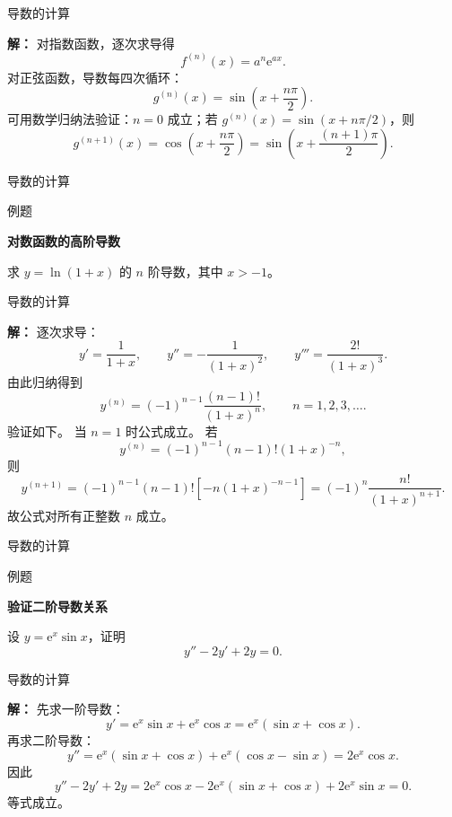 \documentclass[aspectratio=169,10pt,fontset=fandol]{ctexbeamer}
\newcommand{\ee}{\mathrm{e}}
\begin{document}
\begin{frame}[t,fragile]{导数的计算}
\footnotesize
{\footnotesize
\textbf{解：}
对指数函数，逐次求导得
\[
f^{(n)}(x)=a^n\ee^{ax}.
\]
对正弦函数，导数每四次循环：
\[
g^{(n)}(x)=\sin\left(x+\frac{n\pi}{2}\right).
\]
可用数学归纳法验证：$n=0$ 成立；若 $g^{(n)}(x)=\sin(x+n\pi/2)$，则
\[
g^{(n+1)}(x)=\cos\left(x+\frac{n\pi}{2}\right)=\sin\left(x+\frac{(n+1)\pi}{2}\right).
\]

}
\end{frame}
\begin{frame}[t,fragile]{导数的计算}
\footnotesize
\begin{block}{例题}
{\footnotesize
\textbf{对数函数的高阶导数}\par

求 $y=\ln(1+x)$ 的 $n$ 阶导数，其中 $x>-1$。

}
\end{block}
\end{frame}
\begin{frame}[t,fragile]{导数的计算}
\footnotesize
{\footnotesize
\textbf{解：}
逐次求导：
\[
y'=\frac1{1+x},\qquad
y''=-\frac1{(1+x)^2},\qquad
y'''=\frac{2!}{(1+x)^3}.
\]
由此归纳得到
\[
y^{(n)}=(-1)^{n-1}\frac{(n-1)!}{(1+x)^n},\qquad n=1,2,3,\ldots.
\]
验证如下。 当 $n=1$ 时公式成立。 若
\[
y^{(n)}=(-1)^{n-1}(n-1)!(1+x)^{-n},
\]
则
\[
y^{(n+1)}
=(-1)^{n-1}(n-1)![-n(1+x)^{-n-1}]
=(-1)^n\frac{n!}{(1+x)^{n+1}}.
\]
故公式对所有正整数 $n$ 成立。

}
\end{frame}
\begin{frame}[t,fragile]{导数的计算}
\footnotesize
\begin{block}{例题}
{\footnotesize
\textbf{验证二阶导数关系}\par

设 $y=\ee^x\sin x$，证明
\[
y''-2y'+2y=0.
\]

}
\end{block}
\end{frame}
\begin{frame}[t,fragile]{导数的计算}
\footnotesize
{\footnotesize
\textbf{解：}
先求一阶导数：
\[
y'=\ee^x\sin x+\ee^x\cos x=\ee^x(\sin x+\cos x).
\]
再求二阶导数：
\[
y''=\ee^x(\sin x+\cos x)+\ee^x(\cos x-\sin x)=2\ee^x\cos x.
\]
因此
\[
y''-2y'+2y
=2\ee^x\cos x-2\ee^x(\sin x+\cos x)+2\ee^x\sin x=0.
\]
等式成立。

}
\end{frame}
\end{document}
